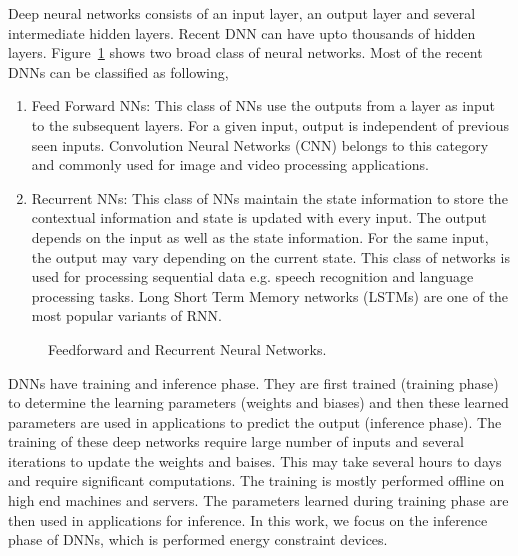 \documentclass[a4paper,10pt]{article}
\begin{document}
Deep neural networks consists of an input layer, an output layer and several intermediate hidden layers. Recent DNN can have upto thousands of hidden layers. Figure~\ref{fig:typesNN} shows two broad class of neural networks. Most of the recent DNNs can be classified as following,
\begin{enumerate}
	\item Feed Forward NNs: This class of NNs use the outputs from a layer as input to the subsequent layers. For a given input, output is independent of previous seen inputs. Convolution Neural Networks (CNN) belongs to this category and commonly used for image and video processing applications. 
	\item Recurrent NNs: This class of NNs maintain the state information to store the contextual information and state is updated with every input. The output depends on the input as well as the state information. For the same input, the output may vary depending on the current state. This class of networks is used for processing sequential data e.g. speech recognition and language processing tasks. Long Short Term Memory networks (LSTMs) are one of the most popular variants of RNN.
\end{enumerate}
\begin{figure}[!htb]
	\centering
	\hfil
	\caption{Feedforward and Recurrent Neural Networks.}
	\label{fig:typesNN}
	\vspace{-1.0em}	
\end{figure}
DNNs have training and inference phase. They are first trained (training phase) to determine the learning parameters (weights and biases) and then these learned parameters are used in applications to predict the output (inference phase). The training of these deep networks require large number of inputs and several iterations to update the weights and baises. This may take several hours to days and require significant computations. The training is mostly performed offline on high end machines and servers. The parameters learned during training phase are then used in applications for inference. In this work, we focus on the inference phase of DNNs, which is performed energy constraint devices.
\end{document}
